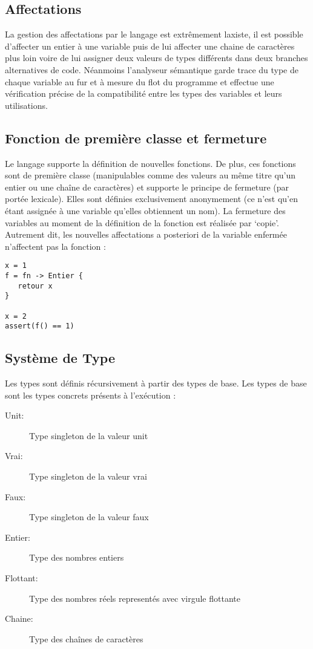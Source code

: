 \subsection{Affectations}

La gestion des affectations par le langage est extrêmement laxiste,
il est possible d'affecter un entier à une variable puis de lui
affecter une chaine de caractères plus loin voire de lui assigner deux
valeurs de types différents dans deux branches alternatives de code.
Néanmoins l'analyseur sémantique garde trace du type de chaque
variable au fur et à mesure du flot du programme et effectue une
vérification précise de la compatibilité entre les types des variables
et leurs utilisations.

\subsection{Fonction de première classe et fermeture}

Le langage supporte la définition de nouvelles fonctions. De plus,
ces fonctions sont de première classe (manipulables comme des
valeurs au même titre qu'un entier ou une chaîne de caractères)
et supporte le principe de fermeture (par portée lexicale). Elles
sont définies exclusivement anonymement (ce n'est qu'en
étant assignée à une variable qu'elles obtiennent un nom).
La fermeture des variables au moment de la définition de la fonction
est réalisée par `copie'. Autrement dit, les nouvelles affectations
a posteriori de la variable enfermée n'affectent pas la fonction :
\begin{verbatim}
x = 1
f = fn -> Entier {
   retour x
}

x = 2
assert(f() == 1)
\end{verbatim}

\subsection{Système de Type}
Les types sont définis récursivement à partir des types de base.
Les types de base sont les types concrets présents à l'exécution :
\begin{description}
   \item[Unit:] Type singleton de la valeur unit
   \item[Vrai:] Type singleton de la valeur vrai
   \item[Faux:] Type singleton de la valeur faux
   \item[Entier:] Type des nombres entiers
   \item[Flottant:] Type des nombres réels representés avec virgule flottante
   \item[Chaine:] Type des chaînes de caractères
\end{description}

